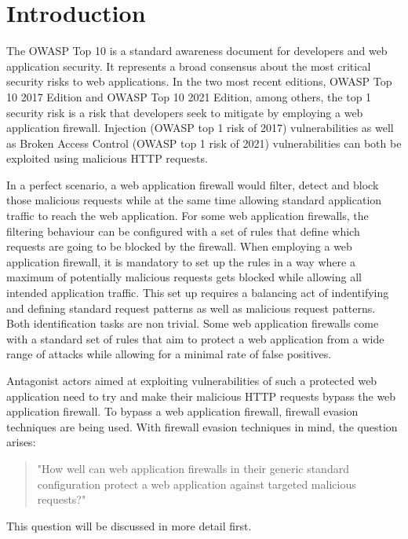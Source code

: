 \section{Introduction}
The OWASP Top 10 is a standard awareness document for developers and web application security. It represents a broad consensus about the most critical security risks to web applications. \cite{OWASP/Top10} In the two most recent editions, OWASP Top 10 2017 Edition and OWASP Top 10 2021 Edition, among others, the top 1 security risk is a risk that developers seek to mitigate by employing a web application firewall. \cite{OWASP/Risks2017,OWASP/Risks2021} Injection (OWASP top 1 risk of 2017) vulnerabilities as well as Broken Access Control (OWASP top 1 risk of 2021) vulnerabilities can both be exploited using malicious HTTP requests. \cite{OWASP/Injection,OWASP/BrokenAccessControl}

In a perfect scenario, a web application firewall would filter, detect and block those malicious requests while at the same time allowing standard application traffic to reach the web application. For some web application firewalls, the filtering behaviour can be configured with a set of rules that define which requests are going to be blocked by the firewall. \cite{OWASP/CRS,wargio/naxsiRules,Cisco/SnortRulesDocs}
When employing a web application firewall, it is mandatory to set up the rules in a way where a maximum of potentially malicious requests gets blocked while allowing all intended application traffic. This set up requires a balancing act of indentifying and defining standard request patterns as well as malicious request patterns. Both identification tasks are non trivial. Some web application firewalls come with a standard set of rules that aim to protect a web application from a wide range of attacks while allowing for a minimal rate of false positives. \cite{OWASP/CRS,wargio/naxsiRules,Cisco/SnortRulesDownload}

Antagonist actors aimed at exploiting vulnerabilities of such a protected web application need to try and make their malicious HTTP requests bypass the web application firewall. To bypass a web application firewall, firewall evasion techniques are being used. \cite{HackTricks/WAFBypass} With firewall evasion techniques in mind, the question arises: 
\begin{quote} "How well can web application firewalls in their generic standard configuration protect a web application against targeted malicious requests?" 
\end{quote}
This question will be discussed in more detail first.
